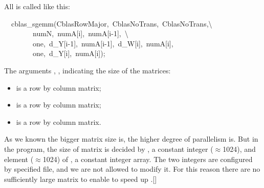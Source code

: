 \documentclass{article}
\begin{document}
\noindent{}All  is called like this:%
\begin{mdpre}%
\noindent~~cblas\_sgemm({CblasRowMajor},~{CblasNoTrans},~{CblasNoTrans},\textbackslash{}\\
~~~~~~~~numN,~numA[i],~numA[i-{1}],~\textbackslash{}\\
~~~~~~~~one,~d\_Y[i-{1}],~numA[i-{1}],~d\_W[i],~numA[i],\\
~~~~~~~~one,~d\_Y[i],~numA[i]);%
\end{mdpre}\noindent{}The arguments , ,  indicating the size of the matrices:

\begin{itemize}[noitemsep,topsep=\mdcompacttopsep]%

\item{} is a  row by  column matrix;%

\item{} is a  row by  column matrix;%

\item{} is a  row by  column matrix.%
\end{itemize}%

\noindent{}As we known the bigger matrix size is, the higher degree of  parallelism is. But in the  program, the size of matrix is decided by , a constant integer (\ensuremath{\approx}1024), and element (\ensuremath{\approx}1024) of , a constant integer array. The two integers are configured by specified file, and we are not allowed to modify it. For this reason there are no sufficiently large matrix to enable  to speed up .[]%
\end{document}
